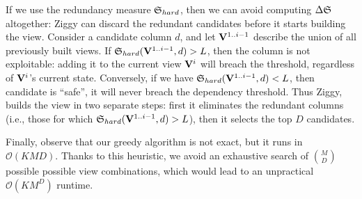 If we use the redundancy measure $\mathfrak{S}_{hard}$, then we can avoid computing $
\Delta\mathfrak{S}$ altogether: Ziggy can discard the redundant candidates before it
starts building the view.  Consider a candidate column $d$, and let
$\mathbf{V}^{1..i-1}$ describe the union of all previously built views. If
$\mathfrak{S}_{hard} (\mathbf{V}^{1..i-1}, d) > L$, then the column is not exploitable:
adding it to the current view $\mathbf{V}^{i}$ will breach the threshold,
regardless of $\mathbf{V}^{i}$'s current state.  Conversely, if we have
$\mathfrak{S}_{hard}(\mathbf{V}^{1..i-1}, d) < L$, then candidate is ``safe'', it will
never breach the dependency threshold.  Thus Ziggy, builds the
view in two separate steps: first it eliminates the redundant columns (i.e.,
those for which $\mathfrak{S}_{hard} (\mathbf{V}^{1..i-1}, d) > L$), then it selects the
top $D$ candidates. 

Finally, observe that our greedy algorithm is not exact, but it runs
in~$\mathcal{O}(KMD)$. Thanks to this heuristic, we avoid an exhaustive search
of $\binom{M}{D}$ possible possible view combinations, which would lead to an
unpractical $\mathcal{O}(KM^D)$ runtime.


